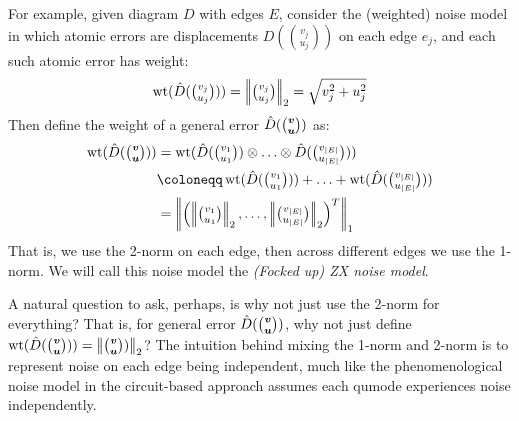For example, given diagram $D$ with edges $E$, consider the (weighted) noise model in which atomic errors are displacements $D(\binom{v_j}{u_j})$ on each edge $e_j$, and each such atomic error has weight:
\begin{equation}\label{eq:weight_atomic_error_zx_noise}
    \operatorname{wt}(\hat{D}(\tbinom{v_j}{u_j})) = \left| \! \left| \tbinom{v_j}{u_j} \right| \! \right|_2 = \sqrt{v_j^2 + u_j^2}
\end{equation}
Then define the weight of a general error $\hat{D}(\binom{\boldsymbol{v}}{\boldsymbol{u}})$ as:
\begin{equation}\label{eq:weight_general_error_zx_noise}
    \begin{aligned}
        \wt(\hat{D}(\tbinom{\bsym{v}}{\bsym{u}}))
        &= \wt(\hat{D}(\tbinom{v_1}{u_1}) \otimes \ldots \otimes \hat{D}(\tbinom{v_{|E|}}{u_{|E|}})) \\
        &\coloneqq \wt(\hat{D}(\tbinom{v_1}{u_1})) + \ldots + \wt(\hat{D}(\tbinom{v_{|E|}}{u_{|E|}})) \\
        &= \onenorm{\left(\twonorm{\tbinom{v_1}{u_1}}, \ldots, \twonorm{\tbinom{v_{|E|}}{u_{|E|}}}\right)^T}
    \end{aligned}
\end{equation}
That is, we use the 2-norm on each edge, then across different edges we use the 1-norm.
We will call this noise model the \textit{(Focked up) ZX noise model}.

A natural question to ask, perhaps, is why not just use the 2-norm for everything?
That is, for general error $\hat{D}(\tbinom{\boldsymbol{v}}{\boldsymbol{u}})$, why not just define $\operatorname{wt}(\hat{D}(\tbinom{\boldsymbol{v}}{\boldsymbol{u}})) = \left| \! \left| \tbinom{\boldsymbol{v}}{\boldsymbol{u}}) \right| \! \right|_2$?
The intuition behind mixing the 1-norm and 2-norm is to represent noise on each edge being independent, much like the phenomenological noise model in the circuit-based approach assumes each qumode experiences noise independently.
